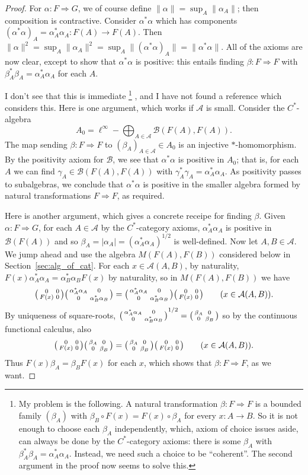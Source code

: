 \documentclass[a4paper,11pt]{article}
\theoremstyle{plain}
\theoremstyle{remark}
\newcommand{\mc}[1]{\mathcal{#1}}
\newenvironment{smat}{\bigl(\begin{smallmatrix}}{\end{smallmatrix}\bigr)}
\newcommand{\smattwo}[4]{\begin{smat}{#1}&{#2}\\{#3}&{#4}\end{smat}}
\begin{document}
\begin{proof}
For $\alpha \colon F \Rightarrow G$, we of course define $\|\alpha\| = \sup_A \|\alpha_A\|$; then composition is contractive.  Consider $\alpha^*\alpha$ which has components $(\alpha^*\alpha)_A = \alpha_A^* \alpha_A \colon F(A) \to F(A)$.  Then $\|\alpha\|^2 = \sup_A \|\alpha_A\|^2 = \sup_A \| (\alpha^*\alpha)_A \| = \|\alpha^*\alpha\|$.  All of the axioms are now clear, except to show that $\alpha^*\alpha$ is positive: this entails finding $\beta \colon F \Rightarrow F$ with $\beta_A^*\beta_A = \alpha_A^*\alpha_A$ for each $A$.

I don't see that this is immediate%
\footnote{My problem is the following.  A natural transformation $\beta \colon F \Rightarrow F$ is a bounded family $(\beta_A)$ with $\beta_B \circ F(x) = F(x) \circ \beta_A$ for every $x\colon A\to B$.  So it is not enough to choose each $\beta_A$ independently, which, axiom of choice issues aside, can always be done by the $C^*$-category axioms: there is some $\beta_A$ with $\beta_A^*\beta_A = \alpha_A^*\alpha_A$.  Instead, we need such a choice to be ``coherent''.  The second argument in the proof now seems to solve this.}%
, and I have not found a reference which considers this.  Here is one argument, which works if $\mc A$ is small.  Consider the $C^*$-algebra
\[ A_0 = \ell^\infty - \bigoplus_{A\in\mc A} \mc B(F(A), F(A)). \]
The map sending $\beta\colon F \Rightarrow F$ to $(\beta_A)_{A\in\mc A} \in A_0$ is an injective $*$-homomorphism.  By the positivity axiom for $\mc B$, we see that $\alpha^*\alpha$ is positive in $A_0$; that is, for each $A$ we can find $\gamma_A \in \mc B(F(A), F(A))$ with $\gamma_A^*\gamma_A = \alpha_A^*\alpha_A$.  As positivity passes to subalgebras, we conclude that $\alpha^*\alpha$ is positive in the smaller algebra formed by natural transformations $F\Rightarrow F$, as required.

Here is another argument, which gives a concrete receipe for finding $\beta$.  Given $\alpha\colon F\Rightarrow G$, for each $A\in\mc A$ by the $C^*$-category axioms, $\alpha_A^*\alpha_A$ is positive in $\mc B(F(A))$ and so $\beta_A = |\alpha_A| = (\alpha_A^*\alpha_A)^{1/2}$ is well-defined.  Now let $A,B\in\mc A$.  We jump ahead and use the algebra $M(F(A),F(B))$ considered below in Section~\ref{sec:alg_of_cat}.  For each $x\in\mc A(A,B)$, by naturality, $F(x) \alpha_A^*\alpha_A = \alpha_B^*\alpha_B F(x)$ by naturality, so in $M(F(A), F(B))$ we have
\[ \smattwo{0}{0}{F(x)}{0} \smattwo{\alpha_A^*\alpha_A}{0}{0}{\alpha_B^*\alpha_B} = 
\smattwo{\alpha_A^*\alpha_A}{0}{0}{\alpha_B^*\alpha_B} \smattwo{0}{0}{F(x)}{0} \qquad(x\in\mc A(A,B)). \]
By uniqueness of square-roots, $\smattwo{\alpha_A^*\alpha_A}{0}{0}{\alpha_B^*\alpha_B}^{1/2} = \smattwo{\beta_A}{0}{0}{\beta_B}$ so by the continuous functional calculus, also 
\[ \smattwo{0}{0}{F(x)}{0} \smattwo{\beta_A}{0}{0}{\beta_B} = 
\smattwo{\beta_A}{0}{0}{\beta_B} \smattwo{0}{0}{F(x)}{0} \qquad(x\in\mc A(A,B)). \]
Thus $F(x) \beta_A = \beta_B F(x)$ for each $x$, which shows that $\beta \colon F \Rightarrow F$, as we want.
\end{proof}
\end{document}
